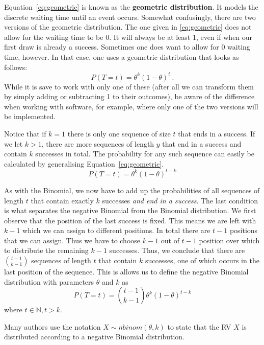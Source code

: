 Equation~\eqref{eq:geometric} is known as the \textbf{geometric distribution}. It models the discrete waiting time until an event occurs. Somewhat confusingly, there
are two versions of the geometric distribution. The one given in \eqref{eq:geometric} does not allow for the waiting time to be 0. It will always be at least 1, even
if when our first draw is already a success. Sometimes one does want to allow for 0 waiting time, however. In that case, one uses a geometric distribution that looks as 
follows:
\begin{equation}
P(T=t) = \theta^{k} (1-\theta)^{t} \ .
\end{equation}
While it is save to work with only one of these (after all we can transform them by simply adding or subtracting 1 to their outcomes), be aware of the difference when
working with software, for example, where only one of the two versions will be implemented.

Notice that if $ k=1 $ there is only one sequence of size $ t $ that ends in a success. If we let $ k>1 $, there are more sequences of length $ y $ that end in a success 
and contain $ k $ successes in total. The probability for any such sequence can easily be calculated by generalising Equation~\eqref{eq:geometric}.
\begin{equation}
P(T=t) = \theta^{k} (1-\theta)^{t-k}
\end{equation}

As with the Binomial, we now have to add up the probabilities of all sequences of length $ t $ that contain exactly $ k $ successes \textit{and end in a success}. The
last condition is what separates the negative Binomial from the Binomial distribution. We first observe that the position of the last success is fixed. This means
we are left with $ k-1 $ which we can assign to different positions. In total there are $ t-1 $ positions that we can assign. Thus we have to choose $ k-1 $ out
of $ t-1 $ position over which to distribute the remaining $ k-1 $ successes. Thus, we conclude that there are $ \binom{t-1}{k-1} $ sequences of length $ t $ that
contain $ k $ successes, one of which occurs in the last position of the sequence. This is allows us to define the negative Binomial distribution with parameters 
$ \theta $ and $ k $ as
\begin{equation}
P(T=t) = \binom{t-1}{k-1} \theta^{k} (1-\theta)^{t-k}
\end{equation}
where $ t \in \mathbb{N}, t > k $.

Many authors use the notation $ X \sim nbinom(\theta, k) $ to state that the RV $ X $ is distributed according to a negative Binomial distribution.



